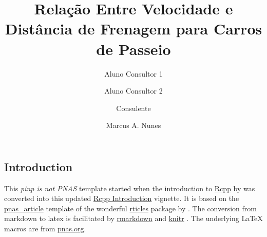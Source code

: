 \documentclass[9pt,twocolumn,twoside,printwatermark=true]{pinp}
\title{Relação Entre Velocidade e Distância de Frenagem para Carros de Passeio}
\author[a,b]{Aluno Consultor 1}
\author[a,b]{Aluno Consultor 2}
\author[c,d]{Consulente}
\author[a,e]{Marcus A. Nunes}
\affil[a]{Departamento de Estatística - UFRN}
\affil[b]{Consultor}
\affil[c]{Outro Departamento - UFRN}
\affil[d]{Consulente}
\affil[e]{Orientação}
\begin{document}
\verticaladjustment{-2pt}

\maketitle
\thispagestyle{firststyle}



\hypertarget{introduction}{%
\subsection{Introduction}\label{introduction}}

This \emph{pinp is not PNAS} template started when the introduction to
\href{http://dirk.eddelbuettel.com/code/rcpp.html}{Rcpp} by
\cite{PeerJ:Rcpp} was converted into this updated
\href{https://eddelbuettel.github.io/pinp/Rcpp-introduction.pdf}{Rcpp
Introduction} vignette. It is based on the
\href{https://github.com/rstudio/rticles/tree/master/inst/rmarkdown/templates/pnas_article}{pnas\_article}
template of the wonderful
\href{https://cran.r-project.org/package=rticles}{rticles} package by
\cite{CRAN:rticles}. The conversion from markdown to latex is
facilitated by
\href{https://cran.r-project.org/package=rmarkdown}{rmarkdown}
\citep{CRAN:rmarkdown} and
\href{https://cran.r-project.org/package=knitr}{knitr}
\citep{CRAN:knitr}. The underlying LaTeX macros are from
\href{http://www.pnas.org/site/authors/latex.xhtml}{pnas.org}.
\end{document}
